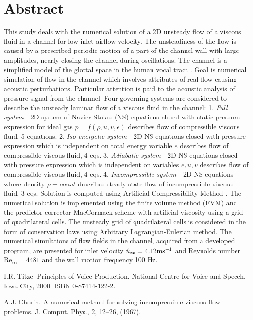 \documentclass[article,A4,11pt]{llncs}%
\begin{document}
\section*{Abstract}
This study deals with the numerical solution of a 2D unsteady flow of a viscous fluid in a channel for low inlet airflow velocity. The unsteadiness of the flow is caused by a prescribed periodic motion of a part of the channel wall with large amplitudes, nearly closing the channel during oscillations. The channel is a simplified model of the glottal space in the human vocal tract \cite{Principles of Voice Production}. Goal is numerical simulation of flow in the channel which involves attributes of real flow causing acoustic perturbations. Particular attention is paid to the acoustic analysis of pressure signal from the channel. Four governing systems are considered to describe the unsteady laminar flow of a viscous fluid in the channel: 1. {\it Full system} - 2D system of Navier-Stokes (NS) equations closed with static pressure expression for ideal gas $p=f(\rho, u, v, e)$ describes flow of compressible viscous fluid, 5 equations. 2. {\it Iso-energetic system} - 2D NS equations closed with pressure expression which is independent on total energy variable $e$ describes flow of compressible viscous fluid, 4 eqs. 3. {\it Adiabatic system} - 2D NS equations closed with pressure expression which is independent on variables $e,u,v$ describes flow of compressible viscous fluid, 4 eqs. 4. {\it Incompressible system} - 2D NS equations where density $\rho=const$ describes steady state flow of incompressible viscous fluid, 3 eqs. Solution is computed using Artificial Compressibility Method \cite{A numerical method for solving incompressible viscous flow problems}. The numerical solution is implemented using the finite volume method (FVM) and the predictor-corrector MacCormack scheme with artificial viscosity using a grid of quadrilateral cells. The unsteady grid of quadrilateral cells is considered in the form of conservation laws using Arbitrary Lagrangian-Eulerian method. The numerical simulations of flow fields in the channel, acquired from a developed program, are presented for inlet velocity $\hat u_{\infty}=4.12 {\rm ms^{-1}}$ and Reynolds number Re$_{\infty} = 4481$ and the wall motion frequency 100 Hz.


\begin{thebibliography}{10}
{\sc I.R. Titze}. {Principles of Voice Production}. National Centre for Voice and Speech, Iowa City, 2000. ISBN 0-87414-122-2.

{\sc A.J. Chorin}. {A numerical method for solving incompressible viscous flow problems}. J. Comput. Phys., 2, 12–26, (1967).
\end{thebibliography}
\end{document}
